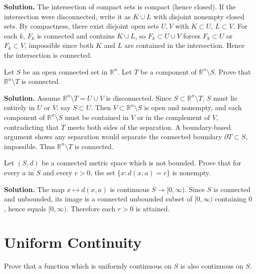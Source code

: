 \noindent\textbf{Solution.}
The intersection of compact sets is compact (hence closed). If the intersection were disconnected, write it as $K\cup L$ with disjoint nonempty closed sets. By compactness, there exist disjoint open sets $U,V$ with $K\subset U$, $L\subset V$. For each $k$, $F_k$ is connected and contains $K\cup L$, so $F_k\subset U\cup V$ forces $F_k\subset U$ or $F_k\subset V$, impossible since both $K$ and $L$ are contained in the intersection. Hence the intersection is connected.
\medskip

\begin{problembox}
Let $S$ be an open connected set in $\mathbb{R}^n$. Let $T$ be a component of $\mathbb{R}^n \setminus S$. Prove that $\mathbb{R}^n \setminus T$ is connected.
\end{problembox}

\noindent\textbf{Solution.}
Assume $\mathbb{R}^n\setminus T=U\cup V$ is disconnected. Since $S\subset\mathbb{R}^n\setminus T$, $S$ must lie entirely in $U$ or $V$; say $S\subset U$. Then $V\subset \mathbb{R}^n\setminus S$ is open and nonempty, and each component of $\mathbb{R}^n\setminus S$ must be contained in $V$ or in the complement of $V$, contradicting that $T$ meets both sides of the separation. A boundary-based argument shows any separation would separate the connected boundary $\partial T\subset S$, impossible. Thus $\mathbb{R}^n\setminus T$ is connected.
\medskip

\begin{problembox}
Let $(S, d)$ be a connected metric space which is not bounded. Prove that for every $a$ in $S$ and every $r > 0$, the set $\{x : d(x, a) = r\}$ is nonempty.
\end{problembox}

\noindent\textbf{Solution.}
The map $x\mapsto d(x,a)$ is continuous $S\to[0,\infty)$. Since $S$ is connected and unbounded, its image is a connected unbounded subset of $[0,\infty)$ containing $0$, hence equals $[0,\infty)$. Therefore each $r>0$ is attained.
\medskip

\section{Uniform Continuity}
\begin{problembox}
Prove that a function which is uniformly continuous on $S$ is also continuous on $S$.
\end{problembox}

